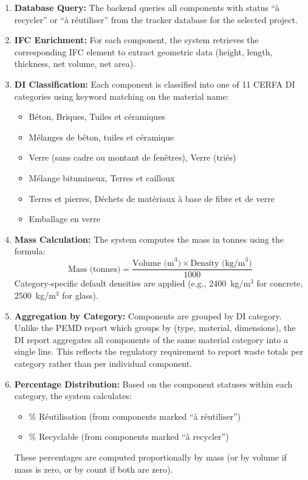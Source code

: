 \documentclass[11pt,a4paper]{article}
\begin{document}
\begin{enumerate}[leftmargin=*]
    \item \textbf{Database Query:} The backend queries all components with status ``\`{a} recycler'' or ``\`{a} r\'{e}utiliser'' from the tracker database for the selected project.
    
    \item \textbf{IFC Enrichment:} For each component, the system retrieves the corresponding IFC element to extract geometric data (height, length, thickness, net volume, net area).
    
    \item \textbf{DI Classification:} Each component is classified into one of 11 CERFA DI categories using keyword matching on the material name:
    \begin{itemize}
        \item B\'{e}ton, Briques, Tuiles et c\'{e}ramiques
        \item M\'{e}langes de b\'{e}ton, tuiles et c\'{e}ramique
        \item Verre (sans cadre ou montant de fen\^{e}tres), Verre (tri\'{e}s)
        \item M\'{e}lange bitumineux, Terres et cailloux
        \item Terres et pierres, D\'{e}chets de mat\'{e}riaux \`{a} base de fibre et de verre
        \item Emballage en verre
    \end{itemize}
    
    \item \textbf{Mass Calculation:} The system computes the mass in tonnes using the formula:
    \[
    \text{Mass (tonnes)} = \frac{\text{Volume (m}^3) \times \text{Density (kg/m}^3)}{1000}
    \]
    Category-specific default densities are applied (e.g., 2400~kg/m$^3$ for concrete, 2500~kg/m$^3$ for glass).
    
    \item \textbf{Aggregation by Category:} Components are grouped by DI category. Unlike the PEMD report which groups by (type, material, dimensions), the DI report aggregates all components of the same material category into a single line. This reflects the regulatory requirement to report waste totals per category rather than per individual component.
    
    \item \textbf{Percentage Distribution:} Based on the component statuses within each category, the system calculates:
    \begin{itemize}
        \item \% R\'{e}utilisation (from components marked ``\`{a} r\'{e}utiliser'')
        \item \% Recyclable (from components marked ``\`{a} recycler'')
    \end{itemize}
    These percentages are computed proportionally by mass (or by volume if mass is zero, or by count if both are zero).
\end{enumerate}
\end{document}
